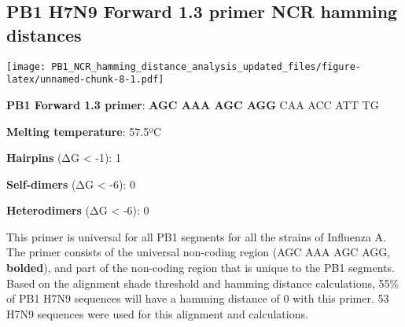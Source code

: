 \documentclass[
]{article}
\newenvironment{Shaded}{\begin{snugshade}}{\end{snugshade}}
\newcommand{\AttributeTok}[1]{\textcolor[rgb]{0.77,0.63,0.00}{#1}}
\newcommand{\DecValTok}[1]{\textcolor[rgb]{0.00,0.00,0.81}{#1}}
\newcommand{\FunctionTok}[1]{\textcolor[rgb]{0.00,0.00,0.00}{#1}}
\newcommand{\NormalTok}[1]{#1}
\newcommand{\OtherTok}[1]{\textcolor[rgb]{0.56,0.35,0.01}{#1}}
\newcommand{\SpecialCharTok}[1]{\textcolor[rgb]{0.00,0.00,0.00}{#1}}
\newcommand{\StringTok}[1]{\textcolor[rgb]{0.31,0.60,0.02}{#1}}
\begin{document}
\hypertarget{pb1-h7n9-forward-1.3-primer-ncr-hamming-distances}{%
\subsection{PB1 H7N9 Forward 1.3 primer NCR hamming
distances}\label{pb1-h7n9-forward-1.3-primer-ncr-hamming-distances}}

\begin{Shaded}
\end{Shaded}

\texttt{[image: PB1\_NCR\_hamming\_distance\_analysis\_updated\_files/figure-latex/unnamed-chunk-8-1.pdf]}

\textbf{PB1 Forward 1.3 primer}: \textbf{AGC AAA AGC AGG} CAA ACC ATT TG

\textbf{Melting temperature}: 57.5ºC

\textbf{Hairpins} (ΔG \textless{} -1): 1

\textbf{Self-dimers} (ΔG \textless{} -6): 0

\textbf{Heterodimers} (ΔG \textless{} -6): 0

This primer is universal for all PB1 segments for all the strains of
Influenza A. The primer consists of the universal non-coding region (AGC
AAA AGC AGG, \textbf{bolded}), and part of the non-coding region that is
unique to the PB1 segments. Based on the alignment shade threshold and
hamming distance calculations, 55\% of PB1 H7N9 sequences will have a
hamming distance of 0 with this primer. 53 H7N9 sequences were used for
this alignment and calculations.
\end{document}
